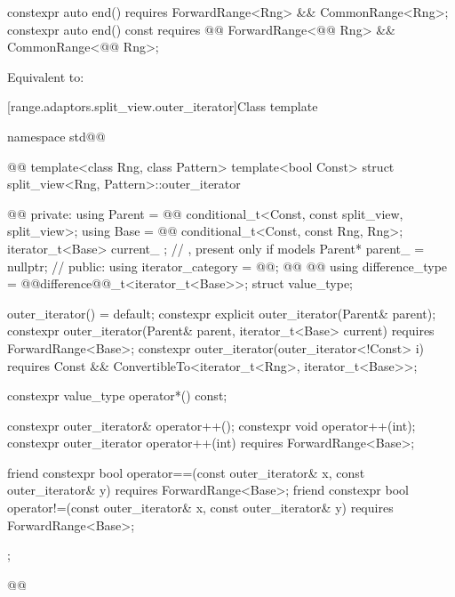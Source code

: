 %
\begin{itemdecl}
constexpr auto end()
  requires ForwardRange<Rng> && CommonRange<Rng>;
constexpr auto end() const
  requires @@ ForwardRange<@@ Rng> && CommonRange<@@ Rng>;
\end{itemdecl}

\begin{itemdescr}
\pnum
\effects Equivalent to:
 \\
\end{itemdescr}

[range.adaptors.split_view.outer_iterator]{Class template }

\pnum
\begin{note}
\end{note}

\begin{codeblock}
namespace std@@ { @@
  template<class Rng, class Pattern>
  template<bool Const>
  struct split_view<Rng, Pattern>::outer_iterator { @\newtxt{// \expos}@
  private:
    using Parent =                @\newtxt{// \expos}@
      conditional_t<Const, const split_view, split_view>;
    using Base   =                @\newtxt{// \expos}@
      conditional_t<Const, const Rng, Rng>;
    iterator_t<Base> current_ {}; // \expos, present only if  models 
    Parent* parent_ = nullptr;    // \expos
  public:
    using iterator_category = @\oldtxt{\seebelownc}@;
    @@
      @@
    using difference_type   = @@difference@@_t<iterator_t<Base>>;
    struct value_type;

    outer_iterator() = default;
    constexpr explicit outer_iterator(Parent& parent);
    constexpr outer_iterator(Parent& parent, iterator_t<Base> current)
      requires ForwardRange<Base>;
    constexpr outer_iterator(outer_iterator<!Const> i) requires Const &&
      ConvertibleTo<iterator_t<Rng>, iterator_t<Base>>;

    constexpr value_type operator*() const;

    constexpr outer_iterator& operator++();
    constexpr void operator++(int);
    constexpr outer_iterator operator++(int) requires ForwardRange<Base>;

    friend constexpr bool operator==(const outer_iterator& x, const outer_iterator& y)
      requires ForwardRange<Base>;
    friend constexpr bool operator!=(const outer_iterator& x, const outer_iterator& y)
      requires ForwardRange<Base>;
  };
}@\oldtxt{\}}@
\end{codeblock}

